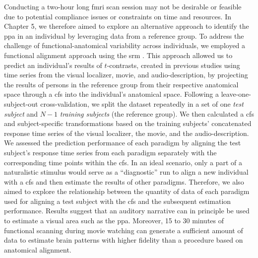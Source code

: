 %
Conducting a two-hour long \ac{fmri} scan session may not be desirable or
feasible due to potential compliance issues or constraints on time and
resources.
%
In Chapter 5, we therefore aimed to explore an alternative approach to identify
the \ac{ppa} in an individual by leveraging data from a reference group.
%
To address the challenge of functional-anatomical variability across
individuals, we employed a functional alignment approach using the \acf{srm}
\citep{chen2015reduced}.
%
This approach allowed us to predict an individual's results of $t$-contrasts,
created in previous studies using time series from the visual localizer, movie,
and audio-description, by projecting the results of persons in the reference
group from their respective anatomical space through a \ac{cfs} into the
individual's anatomical space.
%
Following a leave-one-subject-out cross-validation, we split the dataset
repeatedly in a set of one \textit{test subject} and $N-1$ \textit{training
subjects} (the reference group).
%
We then calculated a \ac{cfs} and subject-specific transformations based on the
training subjects' concatenated response time series of the visual localizer,
the movie, and the audio-description.
%
We assessed the prediction performance of each paradigm by aligning the test
subject's response time series from each paradigm separately with the
corresponding time points within the \ac{cfs}.
%
In an ideal scenario, only a part of a naturalistic stimulus would serve as a
``diagnostic'' run to align a new individual with a \ac{cfs} and then estimate
the results of other paradigms.
%
Therefore, we also aimed to explore the relationship between the quantity of
data of each paradigm used for aligning a test subject with the \ac{cfs} and the
subsequent estimation performance.
Results suggest that an auditory narrative can in principle be
used to estimate a visual area such as the \ac{ppa}.
%
Moreover, 15 to 30 minutes of functional scanning during movie watching can
generate a sufficient amount of data to estimate brain patterns with higher
fidelity than a procedure based on anatomical alignment.

